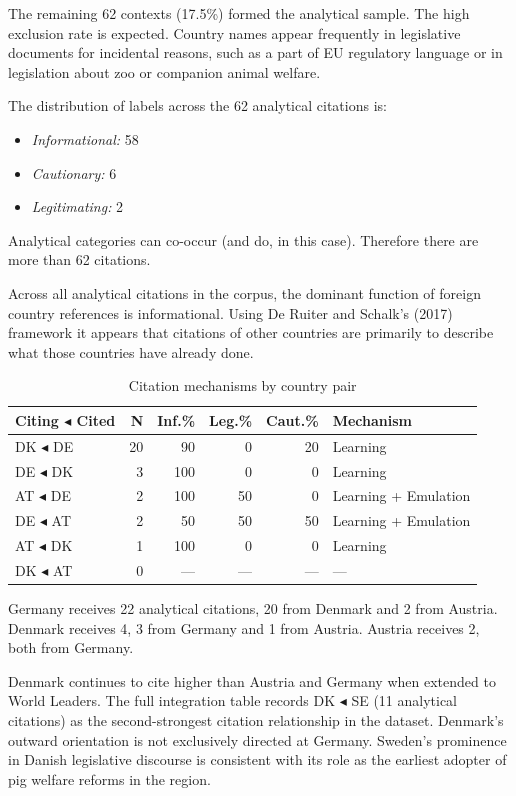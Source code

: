 \documentclass[twocolumn, 10pt, a4paper]{article}
\begin{document}
The remaining 62 contexts (17.5\%) formed the analytical sample. The high exclusion
rate is expected. Country names appear frequently in legislative documents for
incidental reasons, such as a part of EU regulatory language or in legislation about
zoo or companion animal welfare.

The distribution of labels across the 62 analytical citations is:
\begin{itemize}
  \item \textit{Informational:} 58
  \item \textit{Cautionary:} 6
  \item \textit{Legitimating:} 2
\end{itemize}

Analytical categories can co-occur (and do, in this case). Therefore there are more
than 62 citations.

Across all analytical citations in the corpus, the dominant function of foreign
country references is informational. Using De Ruiter and Schalk's (2017) framework
it appears that citations of other countries are primarily to describe what those
countries have already done.

\begin{table}[h]
\centering
\footnotesize
\caption{Citation mechanisms by country pair}
\label{tab:mechanisms}
\begin{tabular}{lrrrrl}
\toprule
Citing $\blacktriangleleft$ Cited & N & Inf.\% & Leg.\% & Caut.\% & Mechanism \\
\midrule
DK $\blacktriangleleft$ DE & 20 & 90 & 0 & 20 & Learning \\
DE $\blacktriangleleft$ DK & 3  & 100 & 0 & 0 & Learning \\
AT $\blacktriangleleft$ DE & 2  & 100 & 50 & 0 & Learning + Emulation \\
DE $\blacktriangleleft$ AT & 2  & 50 & 50 & 50 & Learning + Emulation \\
AT $\blacktriangleleft$ DK & 1  & 100 & 0 & 0 & Learning \\
DK $\blacktriangleleft$ AT & 0  & --- & --- & --- & --- \\
\bottomrule
\end{tabular}
\end{table}

Germany receives 22 analytical citations, 20 from Denmark and 2 from Austria.
Denmark receives 4, 3 from Germany and 1 from Austria. Austria receives 2, both from
Germany.

Denmark continues to cite higher than Austria and Germany when extended to World
Leaders. The full integration table records DK $\blacktriangleleft$ SE (11 analytical citations) as
the second-strongest citation relationship in the dataset. Denmark's outward
orientation is not exclusively directed at Germany. Sweden's prominence in Danish
legislative discourse is consistent with its role as the earliest adopter of pig
welfare reforms in the region.
\end{document}
